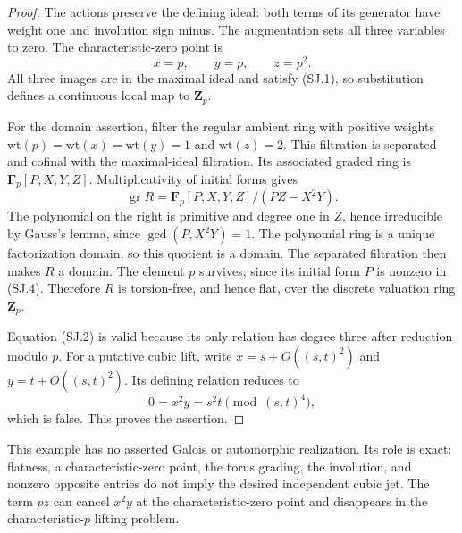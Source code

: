 \begin{proof}
The actions preserve the defining ideal: both terms of its
generator have weight one and involution sign minus.
The augmentation sets all three variables to zero.
The characteristic-zero point is
\[
                         x=p,\qquad y=p,\qquad z=p^2.
                                                               \tag{SJ.3}
\]
All three images are in the maximal ideal and satisfy (SJ.1),
so substitution defines a continuous local map to $\mathbf Z_p$.

For the domain assertion, filter the regular ambient ring
with positive weights
$\mathrm{wt}(p)=\mathrm{wt}(x)=\mathrm{wt}(y)=1$ and
$\mathrm{wt}(z)=2$.
This filtration is separated and cofinal with the
maximal-ideal filtration.  Its associated graded ring is
$\mathbf F_p[P,X,Y,Z]$.
Multiplicativity of initial forms gives
\[
 \operatorname{gr}R
      =\mathbf F_p[P,X,Y,Z]/(PZ-X^2Y).                  \tag{SJ.4}
\]
The polynomial on the right is primitive and degree one
in $Z$, hence irreducible by Gauss's lemma, since
$\gcd(P,X^2Y)=1$.  The polynomial ring is a unique
factorization domain, so this quotient is a domain.
The separated filtration then makes $R$ a domain.
The element $p$ survives, since its initial form $P$
is nonzero in (SJ.4).  Therefore $R$ is torsion-free,
and hence flat, over the discrete valuation ring
$\mathbf Z_p$.

Equation (SJ.2) is valid because its only relation has
degree three after reduction modulo $p$.
For a putative cubic lift, write
$x=s+O((s,t)^2)$ and $y=t+O((s,t)^2)$.
Its defining relation reduces to
\[
                      0=x^2y=s^2t\pmod{(s,t)^4},
                                                               \tag{SJ.5}
\]
which is false.  This proves the assertion.
\end{proof}

This example has no asserted Galois or automorphic realization.
Its role is exact: flatness, a characteristic-zero point,
the torus grading, the involution, and nonzero opposite
entries do not imply the desired independent cubic jet.
The term $pz$ can cancel $x^2y$ at the characteristic-zero
point and disappears in the characteristic-$p$ lifting problem.

